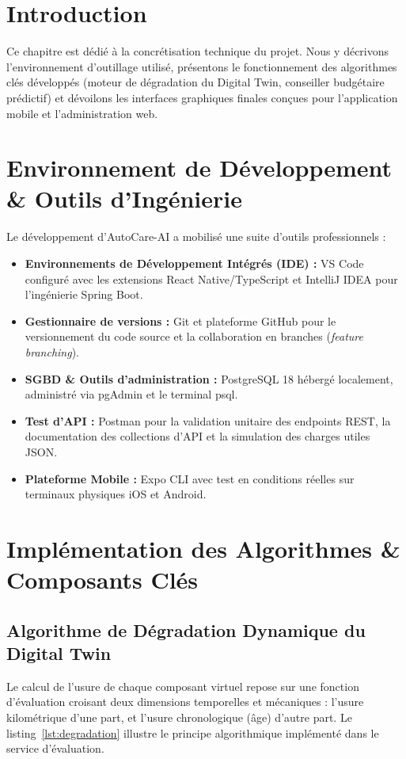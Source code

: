 \documentclass[12pt,a4paper,twoside,openright]{report}
\newcommand{\itembullet}{\textcolor{secondaryBlue}{$\blacktriangleright$}}
\begin{document}
  \section{Introduction}
  Ce chapitre est d\'edi\'e \`a la concr\'etisation technique du projet. Nous y d\'ecrivons l'environnement d'outillage utilis\'e, pr\'esentons le fonctionnement des algorithmes cl\'es d\'evelopp\'es (moteur de d\'egradation du Digital Twin, conseiller budg\'etaire pr\'edictif) et d\'evoilons les interfaces graphiques finales con\c{c}ues pour l'application mobile et l'administration web.

  \section{Environnement de D\'eveloppement \& Outils d'Ing\'enierie}
  Le d\'eveloppement d'AutoCare-AI a mobilis\'e une suite d'outils professionnels :
  \begin{itemize}[label=\itembullet]
    \item \textbf{Environnements de D\'eveloppement Int\'egr\'es (IDE) :} VS Code configur\'e avec les extensions React Native/TypeScript et IntelliJ IDEA pour l'ing\'enierie Spring Boot.
    \item \textbf{Gestionnaire de versions :} Git et plateforme GitHub pour le versionnement du code source et la collaboration en branches (\textit{feature branching}).
    \item \textbf{SGBD \& Outils d'administration :} PostgreSQL 18 h\'eberg\'e localement, administr\'e via pgAdmin et le terminal psql.
    \item \textbf{Test d'API :} Postman pour la validation unitaire des endpoints REST, la documentation des collections d'API et la simulation des charges utiles JSON.
    \item \textbf{Plateforme Mobile :} Expo CLI avec test en conditions r\'eelles sur terminaux physiques iOS et Android.
  \end{itemize}

  \section{Impl\'ementation des Algorithmes \& Composants Cl\'es}

  \subsection{Algorithme de D\'egradation Dynamique du Digital Twin}
  Le calcul de l'usure de chaque composant virtuel repose sur une fonction d'\'evaluation croisant deux dimensions temporelles et m\'ecaniques : l'usure kilom\'etrique d'une part, et l'usure chronologique (\^age) d'autre part. Le listing~\ref{lst:degradation} illustre le principe algorithmique impl\'ement\'e dans le service d'\'evaluation.
\end{document}
